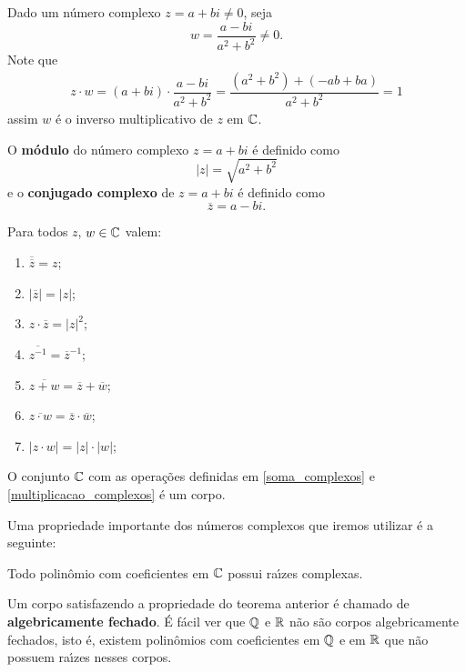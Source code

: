 Dado um n\'umero complexo $z = a + bi \ne 0$, seja
\[
	w = \dfrac{a - bi}{a^2 + b^2} \ne 0.
\]
Note que
\begin{align*}
	z\cdot w = (a + bi)\cdot \dfrac{a - bi}{a^2 + b^2} = \dfrac{(a^2 + b^2) + (-ab + ba)}{a^2 + b^2} = 1
\end{align*}
assim $w$ \'e o inverso multiplicativo de $z$ em $\mathbb{C}$.

O \textbf{m\'odulo} do n\'umero complexo $z = a + bi$ \'e definido como
\[
	|z| = \sqrt{a^2 + b^2}
\]
e o \textbf{conjugado complexo} de $z = a + bi$ \'e definido como
\[
	\overline{z} = a - bi.
\]

\begin{proposicao}
	Para todos $z$, $w \in \mathbb{C}$ valem:
	\begin{enumerate}[label={\roman*})]
		\item $\overline{\overline{z}} = z$;
		\item $|\overline{z}| = |z|$;
		\item $z\cdot\overline{z} = |z|^2$;
		\item $\overline{z^{-1}} = \overline{z}^{-1}$;
		\item $\overline{z + w} = \overline{z} + \overline{w}$;
		\item $\overline{z \cdot w} = \overline{z} \cdot \overline{w}$;
		\item $|z \cdot w| = |z| \cdot |w|$;
	\end{enumerate}
\end{proposicao}

\begin{proposicao}
	O conjunto $\mathbb{C}$ com as operações definidas em \eqref{soma_complexos} e \eqref{multiplicacao_complexos} é um corpo.
\end{proposicao}

Uma propriedade importante dos n\'umeros complexos que iremos utilizar \'e a seguinte:
\begin{teorema}
	Todo polin\^omio com coeficientes em $\mathbb{C}$ possui ra{\'\i}zes complexas.
\end{teorema}

\begin{observacao}
	Um corpo satisfazendo a propriedade do teorema anterior \'e chamado de \textbf{algebricamente fechado}. \'E f\'acil ver que $\mathbb{Q}$ e $\mathbb{R}$ n\~ao s\~ao corpos algebricamente fechados, isto \'e, existem polin\^omios com coeficientes em $\mathbb{Q}$ e em $\mathbb{R}$ que n\~ao possuem ra{\'\i}zes nesses corpos.
\end{observacao}
